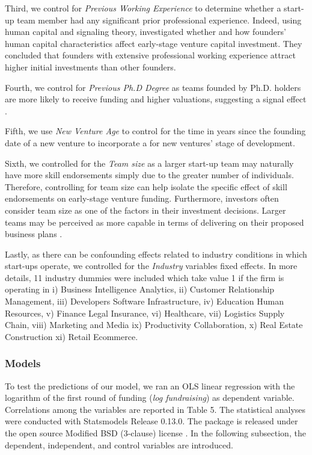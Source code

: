 \documentclass[12pt]{article}
\begin{document}
Third, we control for \textit{Previous Working Experience} to determine whether a start-up team member had any significant prior professional experience. Indeed, using human capital and signaling theory, \citet{subramanian2022backing} investigated whether and how founders' human capital characteristics affect early-stage venture capital investment. They concluded that founders with extensive professional working experience attract higher initial investments than other founders.

Fourth, we control for \textit{Previous Ph.D Degree} as teams founded by Ph.D. holders are more likely to receive funding and higher valuations, suggesting a signal effect \citep{hsu2007experienced}.

Fifth, we use \textit{New Venture Age} to control for the time in years since the founding date of a new venture to incorporate a for new ventures' stage of development.

Sixth, we controlled for the \textit{Team size} as a larger start-up team may naturally have more skill endorsements simply due to the greater number of individuals. Therefore, controlling for team size can help isolate the specific effect of skill endorsements on early-stage venture funding. Furthermore, investors often consider team size as one of the factors in their investment decisions. Larger teams may be perceived as more capable in terms of delivering on their proposed business plans \citep{harrison2007s, williamsky1998demographyand}.

Lastly, as there can be confounding effects related to industry conditions in which start-ups operate, we controlled for the \textit{Industry} variables fixed effects. In more details, 11 industry dummies were included which take value 1 if the firm is operating in i) Business Intelligence Analytics, ii) Customer Relationship Management, iii) Developers Software Infrastructure, iv) Education Human Resources, v) Finance Legal Insurance, vi) Healthcare, vii) Logistics Supply Chain, viii) Marketing and Media ix) Productivity Collaboration, x) Real Estate Construction xi) Retail Ecommerce.

\subsubsection{Models}

To test the predictions of our model, we ran an OLS linear regression with the logarithm of the first round of funding (\textit{log fundraising}) as dependent variable. Correlations among the variables are reported in Table 5\label{table5}. The statistical analyses were conducted with Statsmodels Release 0.13.0. The package is released under the open source Modified BSD (3-clause) license \citep{seabold2010statsmodels}. In the following subsection, the dependent, independent, and control variables are introduced. \\
\end{document}
